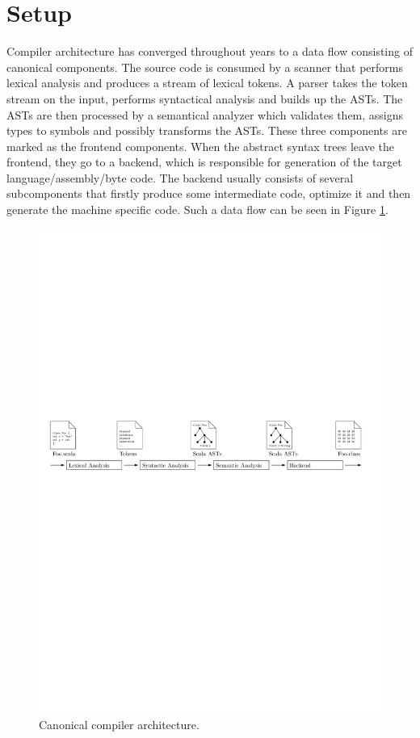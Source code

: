 \documentclass[12pt,a4paper]{report}
\begin{document}
\section{Setup}

Compiler architecture has converged throughout years to a data flow consisting of canonical components. The source code is consumed by a scanner that performs lexical analysis and produces a stream of lexical tokens. A parser takes the token stream on the input, performs syntactical analysis and builds up the ASTs. The ASTs are then processed by a semantical analyzer which validates them, assigns types to symbols and possibly transforms the ASTs. These three components are marked as the frontend components. When the abstract syntax trees leave the frontend, they go to a backend, which is responsible for generation of the target language/assembly/byte code. The backend usually consists of several subcomponents that firstly produce some intermediate code, optimize it and then generate the machine specific code. Such a data flow can be seen in Figure \ref{Compiler}.

\begin{figure}[ht]
  \centering
	\includegraphics[width=\linewidth,height=\textheight,keepaspectratio]{img/Compiler.pdf}
	\caption{Canonical compiler architecture.}
	\label{Compiler}
\end{figure}
\end{document}
